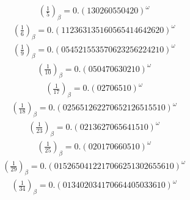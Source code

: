 \documentclass[fleqn]{article}
\begin{document}
\begin{equation*}
\begin{split}
(\frac{1}{5})_\beta = 0.(130260550420)^\omega
\end{split}\end{equation*}
\begin{equation*}
\begin{split}
(\frac{1}{6})_\beta = 0.(112363135160565414642620)^\omega
\end{split}\end{equation*}
\begin{equation*}
\begin{split}
(\frac{1}{9})_\beta = 0.(054521553570623256224210)^\omega
\end{split}\end{equation*}
\begin{equation*}
\begin{split}
(\frac{1}{10})_\beta = 0.(050470630210)^\omega
\end{split}\end{equation*}
\begin{equation*}
\begin{split}
(\frac{1}{17})_\beta = 0.(02706510)^\omega
\end{split}\end{equation*}
\begin{equation*}
\begin{split}
(\frac{1}{18})_\beta = 0.(025651262270652126515510)^\omega
\end{split}\end{equation*}
\begin{equation*}
\begin{split}
(\frac{1}{23})_\beta = 0.(0213627065641510)^\omega
\end{split}\end{equation*}
\begin{equation*}
\begin{split}
(\frac{1}{25})_\beta = 0.(020170660510)^\omega
\end{split}\end{equation*}
\begin{equation*}
\begin{split}
(\frac{1}{29})_\beta = 0.(0152650412217066251302655610)^\omega
\end{split}\end{equation*}
\begin{equation*}
\begin{split}
(\frac{1}{34})_\beta = 0.(013402034170664405033610)^\omega
\end{split}\end{equation*}
\end{document}

